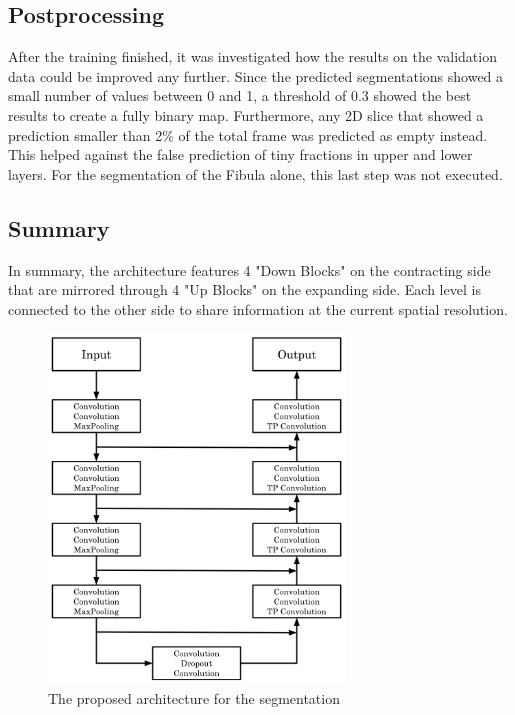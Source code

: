 \subsection{Postprocessing}

After the training finished, it was investigated how the results on the validation data could be improved any further. Since the predicted segmentations showed a small number of values between 0 and 1, a threshold of 0.3 showed the best results to create a fully binary map. Furthermore, any 2D slice that showed a prediction smaller than 2\% of the total frame was predicted as empty instead. This helped against the false prediction of tiny fractions in upper and lower layers. For the segmentation of the Fibula alone, this last step was not executed.

\subsection{Summary}

In summary, the architecture features 4 "Down Blocks" on the contracting side that are mirrored through 4 "Up Blocks" on the expanding side. Each level is connected to the other side to share information at the current spatial resolution.

\begin{figure}[H]
\centering
\par
\includegraphics[width=0.7\textwidth]{imgs/model.png}
\caption{The proposed architecture for the segmentation}
\par
\end{figure}

